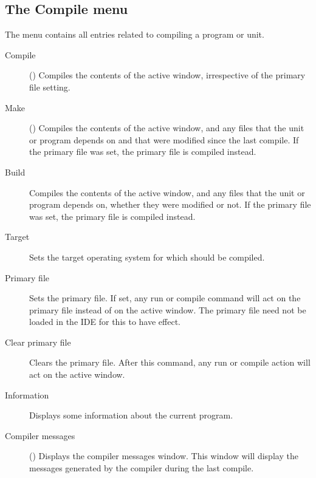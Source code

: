 \subsection{The Compile menu}
\label{se:menucompile}
The  menu contains all entries related to compiling a program or
unit.
\begin{description}
\item[Compile] () Compiles the contents of the active window,
irrespective of the primary file setting.
\item[Make] () Compiles the contents of the active window, and
any files that the unit or program depends on and that were modified since
the last compile.
If the primary file was set, the primary file is compiled instead.
\item[Build]
Compiles the contents of the active window, and any files that the unit or 
program depends on, whether they were modified or not.
If the primary file was set, the primary file is compiled instead.
\item[Target] Sets the target operating system for which should be compiled. 
\item[Primary file] Sets the primary file. If set, any run or compile command 
will act on the primary file instead of on the active window. The primary
file need not be loaded in the IDE for this to have effect.
\item[Clear primary file]
Clears the primary file. After this command, any run or compile action will
act on the active window.
\item[Information] Displays some information about the current program.
\item[Compiler messages] () Displays the compiler messages
window. This window will display the messages generated by the compiler
during the last compile.
\end{description}
%
%
